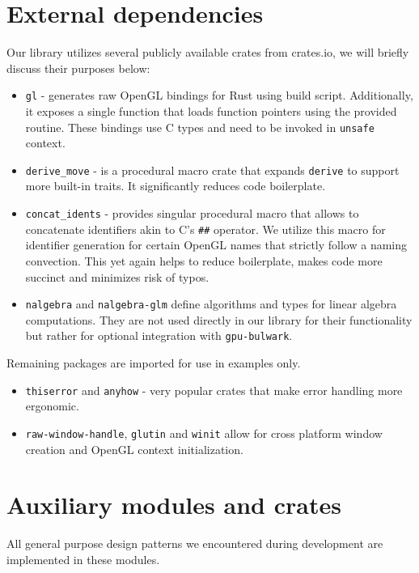 \section{External dependencies}
%
Our library utilizes several publicly available crates from crates.io, we will briefly discuss their purposes below:
\begin{itemize}
    \item \texttt{gl} - generates raw OpenGL bindings for Rust using build script. Additionally, it exposes a single function that loads function pointers using the provided routine. 
    These bindings use C types and need to be invoked in \texttt{unsafe} context.
    \item \texttt{derive\_move} - is a procedural macro crate that expands \texttt{derive} to support more built-in traits. It significantly reduces code boilerplate.
    \item \texttt{concat\_idents} - provides singular procedural macro that allows to concatenate identifiers akin to C's \texttt{\#\#} operator. We utilize this macro for identifier generation for certain OpenGL names that strictly follow a naming convection. This yet again helps to reduce boilerplate, makes code more succinct and minimizes risk of typos.
    \item \texttt{nalgebra} and \texttt{nalgebra-glm} define algorithms and types for linear algebra computations. They are not used directly in our library for their functionality but rather for optional integration with \texttt{gpu-bulwark}.
\end{itemize}
Remaining packages are imported for use in examples only.
%
\begin{itemize}
    \item \texttt{thiserror} and \texttt{anyhow} - very popular crates that make error handling more ergonomic.
    \item \texttt{raw-window-handle}, \texttt{glutin} and \texttt{winit} allow for cross platform window creation and OpenGL context initialization.
\end{itemize}

\section{Auxiliary modules and crates}

All general purpose design patterns we encountered during development are implemented in these modules.


